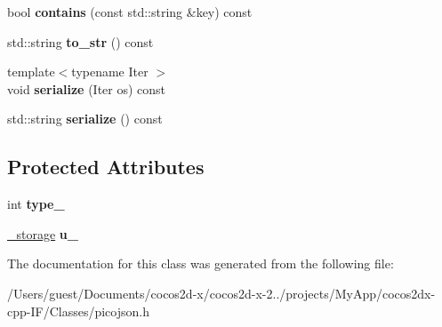\begin{DoxyCompactItemize}
\item 
\hypertarget{classpicojson_1_1value_a14dbd110c8820a94ad4212e3a6b8e95b}{bool {\bfseries contains} (const std\-::string \&key) const }\label{classpicojson_1_1value_a14dbd110c8820a94ad4212e3a6b8e95b}

\item 
\hypertarget{classpicojson_1_1value_aca8f960de0545ae8189189109da47a35}{std\-::string {\bfseries to\-\_\-str} () const }\label{classpicojson_1_1value_aca8f960de0545ae8189189109da47a35}

\item 
\hypertarget{classpicojson_1_1value_a0068248fbccd6b64a367248c1f30cb1f}{{\footnotesize template$<$typename Iter $>$ }\\void {\bfseries serialize} (Iter os) const }\label{classpicojson_1_1value_a0068248fbccd6b64a367248c1f30cb1f}

\item 
\hypertarget{classpicojson_1_1value_a1438a988f179614a3205ddaabac7db57}{std\-::string {\bfseries serialize} () const }\label{classpicojson_1_1value_a1438a988f179614a3205ddaabac7db57}

\end{DoxyCompactItemize}
\subsection*{Protected Attributes}
\begin{DoxyCompactItemize}
\item 
\hypertarget{classpicojson_1_1value_af77ae4525a20f6fce6ea9ff1c4709312}{int {\bfseries type\-\_\-}}\label{classpicojson_1_1value_af77ae4525a20f6fce6ea9ff1c4709312}

\item 
\hypertarget{classpicojson_1_1value_aa7948fe10fcbc19ab9c8dee5e5099f77}{\hyperlink{unionpicojson_1_1value_1_1__storage}{\-\_\-storage} {\bfseries u\-\_\-}}\label{classpicojson_1_1value_aa7948fe10fcbc19ab9c8dee5e5099f77}

\end{DoxyCompactItemize}


The documentation for this class was generated from the following file\-:\begin{DoxyCompactItemize}
\item 
/\-Users/guest/\-Documents/cocos2d-\/x/cocos2d-\/x-\/2../projects/\-My\-App/cocos2dx-\/cpp-\/\-I\-F/\-Classes/picojson.\-h\end{DoxyCompactItemize}
